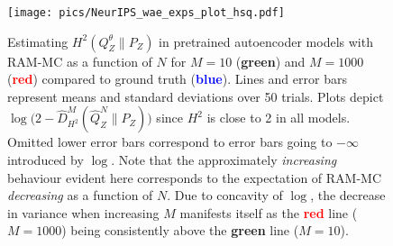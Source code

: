 \begin{figure}
\begin{center}
\texttt{[image: pics/NeurIPS\_wae\_exps\_plot\_hsq.pdf]}
\end{center}
\caption{\label{fig:real-exps-hsq}
Estimating $H^2(Q_Z^\theta \| P_Z)$ in pretrained autoencoder models with RAM-MC as a function of $N$ for $M=10$ ({\bf \textcolor{green!65!blue}{green}}) and $M{=}1000$ ({\bf \textcolor{red}{red}}) compared to ground truth ({\bf\textcolor{blue}{blue}}).
Lines and error bars represent means and standard deviations over 50 trials.
Plots depict $\log\big(2 - \hat{D}^M_{H^2}(\hat{Q}^N_Z \| P_Z)\big)$ since $H^2$ is close to 2 in all models.
Omitted lower error bars correspond to error bars going to $-\infty$ introduced by $\log$.
Note that the approximately \emph{increasing} behaviour evident here corresponds to the expectation of RAM-MC \emph{decreasing} as a function of $N$. 
Due to concavity of $\log$, the decrease in variance when increasing $M$ manifests itself as the {\bf \textcolor{red}{red}} line ($M{=}1000$) being consistently above the {\bf \textcolor{green!65!blue}{green}} line ($M{=}10$).
}
\end{figure}


